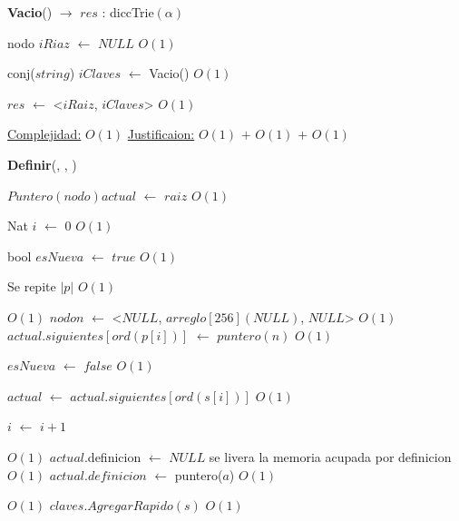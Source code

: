 \begin{Algoritmos}
  
  
\begin{algorithm}[H]
{\textbf{Vacio}() $\to$ $res$ : diccTrie$(\alpha)$}
\begin{algorithmic}[1]

\State nodo $iRiaz$ $\gets $ $NULL$  \Comment $O(1)$
 
\State conj($string$) $iClaves$ $\gets$ Vacio() \Comment $O(1)$

\State $res$ $\gets$ <$iRaiz$, $iClaves$> \Comment $O(1)$

\medskip
\State \underline{Complejidad:} $O(1)$
\State \underline{Justificaion:} $O(1)$ $+$ $O(1)$ $+$ $O(1)$

\end{algorithmic}
\end{algorithm}
  

\begin{algorithm}[H]
{\textbf{Definir}(, , )}
\begin{algorithmic}[1]

\State $Puntero(nodo) actual$ $\gets$ $raiz$ \Comment $O(1)$

\State Nat $i$ $\gets$ $0$ \Comment $O(1)$

\State bool $esNueva$ $\gets$ $true$ \Comment $O(1)$

   \Comment Se repite $|p|$ $O(1)$
	
	
	 \Comment $O(1)$
		\State $nodo n$ $\gets$ <$NULL$, $arreglo[256](NULL)$, $NULL$> \Comment $O(1)$
		\State $actual.siguientes[ord(p[i])]$ $\gets$		 $puntero(n)$ \Comment $O(1)$
		
		\State $esNueva$ $\gets$ $false$ \Comment $O(1)$	 
	
	\EndIf
	
	\State $actual$ $\gets$ $actual.siguientes[ord(s[i])]$ \Comment $O(1)$

	\State $i$ $\gets$ $i + 1$
\EndWhile 

 \Comment $O(1)$
	\State $actual$.definicion $\gets$ $NULL$ \Comment se livera la memoria acupada por definicion $O(1)$
\EndIf
\State $actual$.$definicion$ $\gets$ puntero($a$) \Comment $O(1)$

 \Comment $O(1)$
	\State $claves.AgregarRapido(s)$ \Comment $O(1)$
\EndIf


\end{algorithmic}
\end{algorithm}
\end{Algoritmos}
